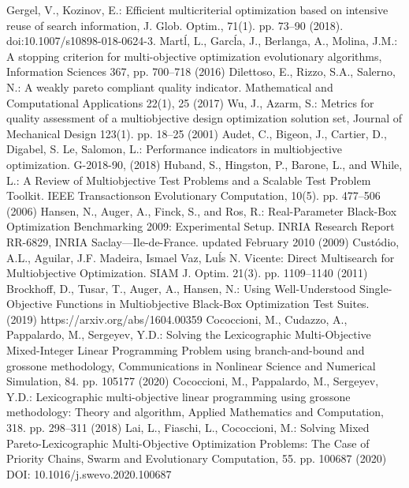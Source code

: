 \documentclass[smallextended]{svjour3}       %
\begin{document}
\begin{thebibliography}{}
 Gergel, V., Kozinov, E.: Efficient multicriterial optimization based on intensive reuse of search information, J. Glob. Optim., 71(1). pp. 73--90 (2018). doi:10.1007/s10898-018-0624-3.
 Mart\'l, L., Garc\'la, J., Berlanga, A., Molina, J.M.: A stopping criterion for multi-objective optimization evolutionary algorithms, Information Sciences 367, pp. 700--718 (2016)
 Dilettoso, E., Rizzo, S.A., Salerno, N.: A weakly pareto compliant quality indicator. Mathematical and Computational Applications 22(1), 25 (2017)
 Wu, J., Azarm, S.: Metrics for quality assessment of a multiobjective design optimization solution set, Journal of Mechanical Design 123(1). pp. 18--25 (2001)
 Audet, C., Bigeon, J., Cartier, D., Digabel,  S. Le, Salomon, L.: Performance indicators in multiobjective optimization. G-2018-90, (2018)
 Huband, S., Hingston, P., Barone, L., and While, L.: A Review of Multiobjective Test Problems and a Scalable Test Problem Toolkit. IEEE Transactionson Evolutionary Computation, 10(5). pp. 477--506 (2006)
 Hansen, N., Auger, A., Finck, S., and Ros, R.: Real-Parameter Black-Box Optimization Benchmarking 2009: Experimental Setup. INRIA Research Report RR-6829, INRIA Saclay—Ile-de-France. updated February 2010 (2009)
 Cust\'odio, A.L., Aguilar, J.F. Madeira, Ismael Vaz, Lu\'ls N. Vicente: Direct Multisearch for Multiobjective Optimization. SIAM J. Optim. 21(3). pp. 1109--1140 (2011)
 Brockhoff, D., Tusar, T., Auger, A., Hansen, N.: Using Well-Understood Single-Objective Functions in Multiobjective Black-Box Optimization Test Suites. (2019) https://arxiv.org/abs/1604.00359 
 Cococcioni, M., Cudazzo, A., Pappalardo, M., Sergeyev, Y.D.: Solving the Lexicographic Multi-Objective Mixed-Integer Linear Programming Problem using branch-and-bound and grossone methodology, Communications in Nonlinear Science and Numerical Simulation, 84. pp. 105177 (2020)
 Cococcioni, M., Pappalardo, M., Sergeyev, Y.D.: Lexicographic multi-objective linear programming using grossone methodology: Theory and algorithm, Applied Mathematics and Computation, 318. pp. 298--311 (2018)
 Lai, L., Fiaschi, L., Cococcioni, M.: Solving Mixed Pareto-Lexicographic Multi-Objective Optimization Problems: The Case of Priority Chains, Swarm and Evolutionary Computation, 55. pp. 100687 (2020) DOI: 10.1016/j.swevo.2020.100687


\end{thebibliography}
\end{document}
